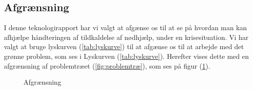 \newpage
\subsection{Afgrænsning}
I denne teknologirapport har vi valgt at afgænse os til at se på hvordan man kan afhjælpe håndteringen af tildkaldelse af nødhjælp, under en krisesituation. Vi har valgt at bruge lyskurven (\ref{tab:lyskurve}) til at afgænse os til at arbejde med det grønne problem, som ses i Lyskurven (\ref{tab:lyskurve}). Herefter vises dette med en afgrænsning af problemtræet (\ref{fig:problemtræ}), som ses på figur (\ref{fig:afgrænsning}).
 
\begin{figure}[H]
    \centering
    \caption{Afgrænsning}
    \label{fig:afgrænsning}
\end{figure}
